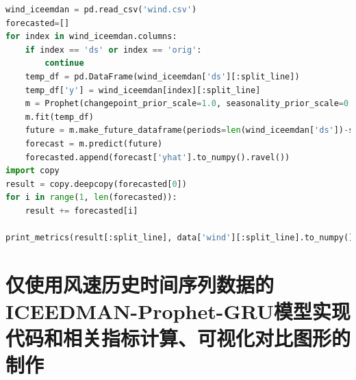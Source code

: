 \documentclass[AutoFakeBold]{LZUThesis}
\begin{document}
\begin{lstlisting}[language = python]
wind_iceemdan = pd.read_csv('wind.csv')
forecasted=[]
for index in wind_iceemdan.columns:
    if index == 'ds' or index == 'orig':
        continue
    temp_df = pd.DataFrame(wind_iceemdan['ds'][:split_line])
    temp_df['y'] = wind_iceemdan[index][:split_line]
    m = Prophet(changepoint_prior_scale=1.0, seasonality_prior_scale=0.1, seasonality_mode='additive', changepoint_range=1, yearly_seasonality=True)
    m.fit(temp_df)
    future = m.make_future_dataframe(periods=len(wind_iceemdan['ds'])-split_line, freq='3H')
    forecast = m.predict(future)
    forecasted.append(forecast['yhat'].to_numpy().ravel())
import copy
result = copy.deepcopy(forecasted[0])
for i in range(1, len(forecasted)):
    result += forecasted[i]

print_metrics(result[:split_line], data['wind'][:split_line].to_numpy())
\end{lstlisting}

\section{仅使用风速历史时间序列数据的ICEEDMAN-Prophet-GRU模型实现代码和相关指标计算、可视化对比图形的制作}
\end{document}
